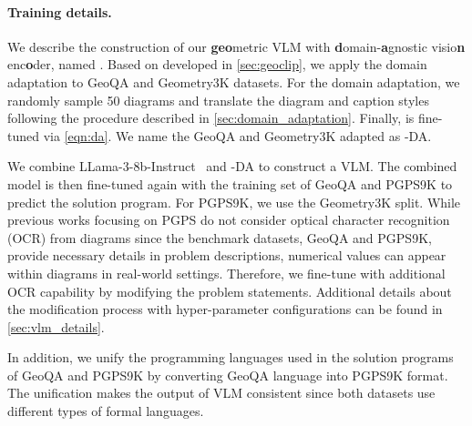 
\paragraph{Training details.}
We describe the construction of our \textbf{geo}metric VLM with \textbf{d}omain-\textbf{a}gnostic visio\textbf{n} enc\textbf{o}der, named \geovlm{}. 
Based on \geoclip{} developed in \cref{sec:geoclip}, we apply the domain adaptation to GeoQA and Geometry3K datasets. For the domain adaptation, we randomly sample 50 diagrams and translate the diagram and caption styles following the procedure described in \cref{sec:domain_adaptation}. Finally, \geoclip{} is fine-tuned via \cref{eqn:da}.
We name the GeoQA and Geometry3K adapted \geoclip{} as \geoclip{}-DA.

We combine LLama-3-8b-Instruct~\citep{llama} and \geoclip{}-DA to construct a VLM. The combined model is then fine-tuned again with the training set of GeoQA and PGPS9K to predict the solution program. For PGPS9K, we use the Geometry3K split.  While previous works focusing on PGPS do not consider optical character recognition (OCR) from diagrams since the benchmark datasets, GeoQA and PGPS9K, provide necessary details in problem descriptions, numerical values can appear within diagrams in real-world settings. Therefore, we fine-tune \geovlm{} with additional OCR capability by modifying the problem statements.
Additional details about the modification process with hyper-parameter configurations can be found in \cref{sec:vlm_details}.

In addition, we unify the programming languages used in the solution programs of GeoQA and PGPS9K by converting GeoQA language into PGPS9K format. The unification makes the output of VLM consistent since both datasets use different types of formal languages.



